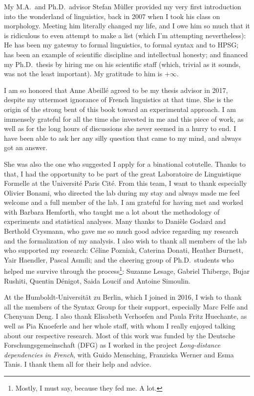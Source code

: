 \addchap{\lsAcknowledgementTitle}\largerpage

My M.A.\ and Ph.D.\ advisor Stefan Müller provided my very first introduction into the wonderland of linguistics, back in 2007 when I took his class on morphology. Meeting him literally changed my life, and I owe him so much that it is ridiculous to even attempt to make a list (which I'm attempting nevertheless): He has been my gateway to formal linguistics, to formal syntax and to HPSG; has been an example of scientific discipline and intellectual honesty; and financed my Ph.D.\ thesis by hiring me on his scientific staff (which, trivial as it sounds, was not the least important). My gratitude to him is +$\infty$.

I am so honored that Anne Abeillé agreed to be my thesis advisor in 2017, despite my uttermost ignorance of French linguistics at that time. She is the origin of the strong bent of this book toward an experimental approach. I am immensely grateful for all the time she invested in me and this piece of work, as well as for the long hours of discussions she never seemed in a hurry to end. I have been able to ask her any silly question that came to my mind, and always got an answer. 

She was also the one who suggested I apply for a binational cotutelle. Thanks to that, I had the opportunity to be part of the great Laboratoire de Linguistique Formelle at the Université Paris Cité. From this team, I want to thank especially Olivier Bonami, who directed the lab during my stay and always made me feel welcome and a full member of the lab. I am grateful for having met and worked with Barbara Hemforth, who taught me a lot about the methodology of experiments and statistical analyses. 
Many thanks to Danièle Godard and Berthold Crysmann, who gave me so much good advice regarding my research and the formalization of my analysis. I also wish to thank all members of the lab who supported my research: Céline Pozniak, Caterina Donati, Heather Burnett, Yair Haendler, Pascal Asmili; and the cheering group of Ph.D.\ students who helped me survive through the process\footnote{Mostly, I must say, because they fed me. A lot.}: Suzanne Lesage, Gabriel Thiberge, Bujar Rushiti, Quentin Dénigot, Saida Loucif and Antoine Simoulin.

At the Humboldt-Universität zu Berlin, which I joined in 2016, I wish to thank all the members of the Syntax Group for their support, especially Marc Felfe and Chenyuan Deng. I also thank  Elisabeth Verhoefen and Paula Fritz Huechante, as well as Pia Knoeferle and her whole staff, with whom I really enjoyed talking about our respective research. 
Most of this work was funded by the Deutsche Forschungsgemeinschaft (DFG) as I worked in the project \emph{Long-distance dependencies in French}, with Guido Mensching, Franziska Werner and Esma Tanis. I thank them all for their help and advice.

